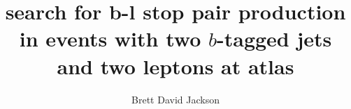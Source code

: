 \title{search for b-l stop pair production in events with two $b$-tagged
       jets and two leptons at atlas}
    
\author{Brett David Jackson}

\newcommand{\adviser}{Evelyn Thomson, Associate Professor, Physics}
\newcommand{\advisershort}{Evelyn Thomson}

\newcommand{\myinstitution}{The University of Pennsylvania}

\newcommand{\chairperson}{Marija Drndic, Professor, Physics}

\newcommand{\committeeOne}{I. Joseph Kroll, Professor, Physics}
\newcommand{\committeeTwo}{H.H. Williams, Professor, Physics}
\newcommand{\committeeThree}{Burt Ovrut, Professor, Physics}
\newcommand{\committeeFour}{--}



